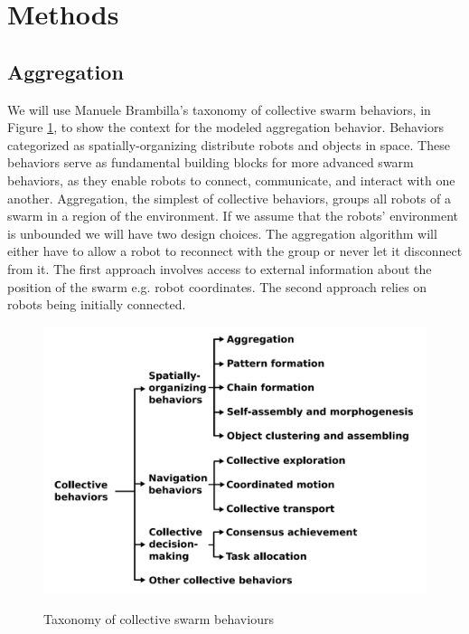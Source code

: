 \section{Methods}



\subsection{Aggregation}
We will use Manuele Brambilla's \cite{Brambilla2013} taxonomy of collective swarm behaviors, in Figure \ref{fig:taxonomy}, to show the context for the modeled aggregation behavior. Behaviors categorized as spatially-organizing distribute robots and objects in space. These behaviors serve as fundamental building blocks for more advanced swarm behaviors, as they enable robots to connect, communicate, and interact with one another. Aggregation, the simplest of collective behaviors, groups all robots of a swarm in a region of the environment. If we assume that the robots' environment is unbounded we will have two design choices. The aggregation algorithm will either have to allow a robot to reconnect with the group or never let it disconnect from it. The first approach involves access to external information about the position of the swarm e.g. robot coordinates. The second approach relies on robots being initially connected.

\begin{figure}[H]
\caption{Taxonomy of collective swarm behaviours \cite{Brambilla2013}}
\includegraphics[width=\textwidth]{images/taxonomy.png}
\label{fig:taxonomy}
\end{figure}


